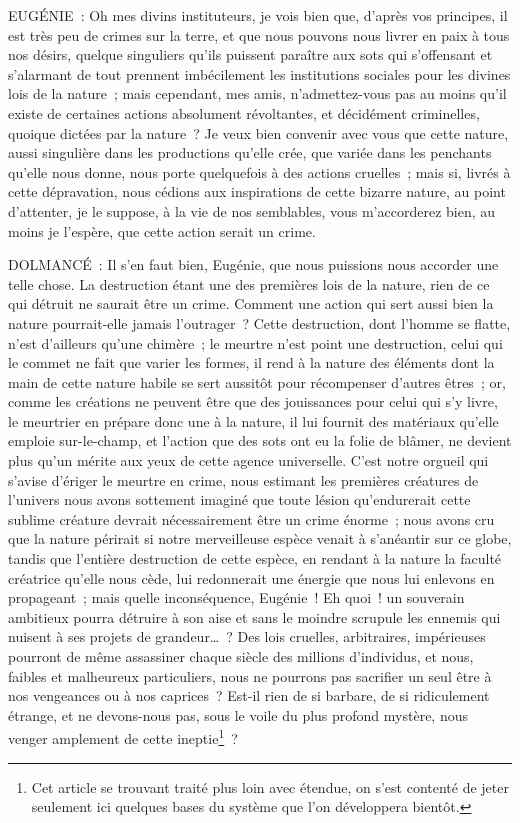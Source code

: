 \documentclass[french,twoside]{book} %
\begin{document}
EUGÉNIE : Oh mes divins instituteurs, je vois bien que, d’après vos principes, il est très peu de crimes sur la terre, et que nous pouvons nous livrer en paix à tous nos désirs, quelque singuliers qu’ils puissent paraître aux sots qui s’offensant et s’alarmant de tout prennent imbécilement les institutions sociales pour les divines lois de la nature ; mais cependant, mes amis, n’admettez-vous pas au moins qu’il existe de certaines actions absolument révoltantes, et décidément criminelles, quoique dictées par la nature ? Je veux bien convenir avec vous que cette nature, aussi singulière dans les productions qu’elle crée, que variée dans les penchants qu’elle nous donne, nous porte quelquefois à des actions cruelles ; mais si, livrés à cette dépravation, nous cédions aux inspirations de cette bizarre nature, au point d’attenter, je le suppose, à la vie de nos semblables, vous m’accorderez bien, au moins je l’espère, que cette action serait un crime.\par
DOLMANCÉ : Il s’en faut bien, Eugénie, que nous puissions nous accorder une telle chose. La destruction étant une des premières lois de la nature, rien de ce qui détruit ne saurait être un crime. Comment une action qui sert aussi bien la nature pourrait-elle jamais l’outrager ? Cette destruction, dont l’homme se flatte, n’est d’ailleurs qu’une chimère ; le meurtre n’est point une destruction, celui qui le commet ne fait que varier les formes, il rend à la nature des éléments dont la main de cette nature habile se sert aussitôt pour récompenser d’autres êtres ; or, comme les créations ne peuvent être que des jouissances pour celui qui s’y livre, le meurtrier en prépare donc une à la nature, il lui fournit des matériaux qu’elle emploie sur-le-champ, et l’action que des sots ont eu la folie de blâmer, ne devient plus qu’un mérite aux yeux de cette agence universelle. C’est notre orgueil qui s’avise d’ériger le meurtre en crime, nous estimant les premières créatures de l’univers nous avons sottement imaginé que toute lésion qu’endurerait cette sublime créature devrait nécessairement être un crime énorme ; nous avons cru que la nature périrait si notre merveilleuse espèce venait à s’anéantir sur ce globe, tandis que l’entière destruction de cette espèce, en rendant à la nature la faculté créatrice qu’elle nous cède, lui redonnerait une énergie que nous lui enlevons en propageant ; mais quelle inconséquence, Eugénie ! Eh quoi ! un souverain ambitieux pourra détruire à son aise et sans le moindre scrupule les ennemis qui nuisent à ses projets de grandeur… ? Des lois cruelles, arbitraires, impérieuses pourront de même assassiner chaque siècle des millions d’individus, et nous, faibles et malheureux particuliers, nous ne pourrons pas sacrifier un seul être à nos vengeances ou à nos caprices ? Est-il rien de si barbare, de si ridiculement étrange, et ne devons-nous pas, sous le voile du plus profond mystère, nous venger amplement de cette ineptie\footnote{ Cet article se trouvant traité plus loin avec étendue, on s’est contenté de jeter seulement ici quelques bases du système que l’on développera bientôt.} ?\par
\end{document}
